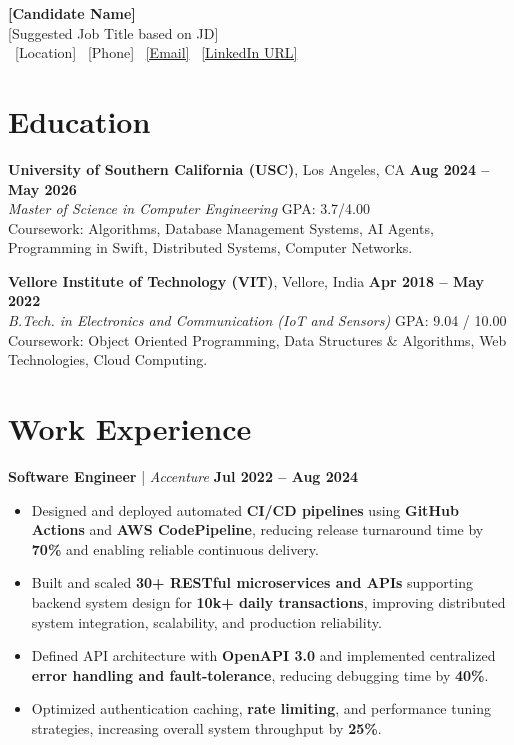 \documentclass[letterpaper,11pt]{article}
\begin{document}
\begin{center}
    {\LARGE \textbf{[Candidate Name]}}\\
    {\normalsize [Suggested Job Title based on JD]}\\
    \small
    \faMapMarker*\ [Location]
    \quad
    \faPhone*\ [Phone]
    \quad
    \faEnvelope\ \href{mailto:[Email]}{[Email]}
    \quad
    \faLinkedin\ \href{[LinkedIn URL]}{[LinkedIn URL]}
\end{center}
\vspace{-13pt}


\section*{Education}
\textbf{University of Southern California (USC)}, Los Angeles, CA \hfill \textbf{Aug 2024 -- May 2026} \\
\textit{Master of Science in Computer Engineering} \hfill GPA: 3.7/4.00 \\
Coursework: Algorithms, Database Management Systems, AI Agents, Programming in Swift, Distributed Systems, Computer Networks.

\vspace{1pt}

\textbf{Vellore Institute of Technology (VIT)}, Vellore, India \hfill \textbf{Apr 2018 -- May 2022} \\
\textit{B.Tech. in Electronics and Communication (IoT and Sensors)} \hfill GPA: 9.04 / 10.00 \\
Coursework: Object Oriented Programming, Data Structures \& Algorithms, Web Technologies, Cloud Computing.

\section*{Work Experience}

\textbf{Software Engineer} \;|\;\hspace{.1cm} \textit{Accenture} \hfill \textbf{Jul 2022 -- Aug 2024} \\

\begin{itemize}[noitemsep]
    \item Designed and deployed automated \textbf{CI/CD pipelines} using \textbf{GitHub Actions} and \textbf{AWS CodePipeline}, reducing release turnaround time by \textbf{70\%} and enabling reliable continuous delivery.
    \item Built and scaled \textbf{30+ RESTful microservices and APIs} supporting backend system design for \textbf{10k+ daily transactions}, improving distributed system integration, scalability, and production reliability.
    \item Defined API architecture with \textbf{OpenAPI 3.0} and implemented centralized \textbf{error handling and fault-tolerance}, reducing debugging time by \textbf{40\%}.
    \item Optimized authentication caching, \textbf{rate limiting}, and performance tuning strategies, increasing overall system throughput by \textbf{25\%}.
\end{itemize}
\end{document}
